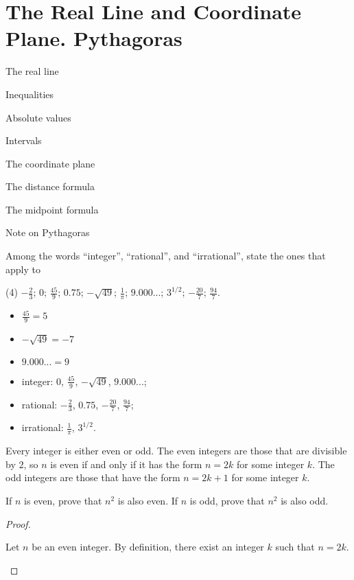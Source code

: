\section{The Real Line and Coordinate Plane. Pythagoras}
\begin{introduction}
  \item The real line
  \item Inequalities
  \item Absolute values
  \item Intervals
  \item The coordinate plane
  \item The distance formula
  \item The midpoint formula
  \item Note on Pythagoras
\end{introduction}
\begin{questions}
  \item Among the words ``integer'', ``rational'', and ``irrational'', state the ones that apply to
  \begin{tasks}(4)
    \task \(-\frac{2}{3}\);
    \task \(0\);
    \task \(\frac{45}{9}\);
    \task \(0.75\);
    \task \(-\sqrt{49}\);
    \task \(\frac{1}{\pi}\);
    \task \(9.000...\);
    \task \(3^{1/2}\);
    \task \(-\frac{20}{7}\);
    \task \(\frac{94}{7}\).
  \end{tasks}
  \begin{note}
    \begin{itemize}
      \item \(\frac{45}{9} = 5\)
      \item \(-\sqrt{49} = -7\)
      \item \(9.000... = 9\)
    \end{itemize}
  \end{note}
  \begin{solution}
    \begin{itemize}
      \item integer: \(0\), \(\frac{45}{9}\), \(-\sqrt{49}\), \(9.000...\);
      \item rational: \(-\frac{2}{3}\), \(0.75\), \(-\frac{20}{7}\), \(\frac{94}{7}\);
      \item irrational: \(\frac{1}{\pi}\), \(3^{1/2}\).
    \end{itemize}
  \end{solution}
  \item Every integer is either even or odd. The even integers are those that are divisible by $2$, so $n$ is even if and only if it has the form $n=2k$ for some integer $k$. The odd integers are those that have the form $n=2k + 1$ for some integer $k$.
  \begin{tasks}
    \task If $n$ is even, prove that $n^2$ is also even.
    \task If $n$ is odd, prove that $n^2$ is also odd.
  \end{tasks}
  \begin{proof}
    \begin{tasks}
      \task Let $n$ be an even integer. By definition, there exist an integer $k$ such that $n=2k$.


\end{tasks}
\end{proof}
\end{questions}
